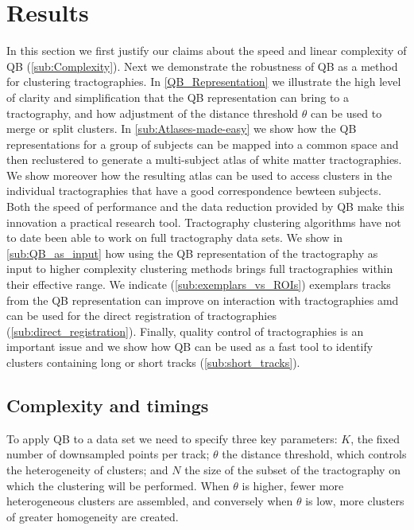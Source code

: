 \documentclass{bioinfo}
\begin{document}
\section{Results}


In this section we first justify our claims about the speed and linear
complexity of QB (\ref{sub:Complexity}). Next we demonstrate the
robustness of QB as a method for clustering tractographies.  In
\ref{QB_Representation} we illustrate the high level of clarity and
simplification that the QB representation can bring to a tractography,
and how adjustment of the distance threshold $\theta$ can be used to
merge or split clusters. In \ref{sub:Atlases-made-easy} we show how the
QB representations for a group of subjects can be mapped into a common
space and then reclustered to generate a multi-subject atlas of white
matter tractographies. We show moreover how the resulting atlas can be
used to access clusters in the individual tractographies that have a
good correspondence bewteen subjects. Both the speed of performance and
the data reduction provided by QB make this innovation a practical
research tool. Tractography clustering algorithms have not to date been
able to work on full tractography data sets. We show in
\ref{sub:QB_as_input} how using the QB representation of the
tractography as input to higher complexity clustering methods brings
full tractographies within their effective range. We indicate
(\ref{sub:exemplars_vs_ROIs}) exemplars tracks from the QB
representation can improve on interaction with tractographies amd can be
used for the direct registration of tractographies
(\ref{sub:direct_registration}). Finally, quality control of
tractographies is an important issue and we show how QB can be used as a
fast tool to identify clusters containing long or short tracks
(\ref{sub:short_tracks}).

\subsection{Complexity and timings\label{sub:Complexity}}

To apply QB to a data set we need to specify three key parameters:
$K$, the fixed number of downsampled points per track; $\theta$
the distance threshold, which controls the heterogeneity of clusters;
and $N$ the size of the subset of the tractography on which the clustering
will be performed. When $\theta$ is higher, fewer more heterogeneous
clusters are assembled, and conversely when $\theta$ is low, more
clusters of greater homogeneity are created.
\end{document}
